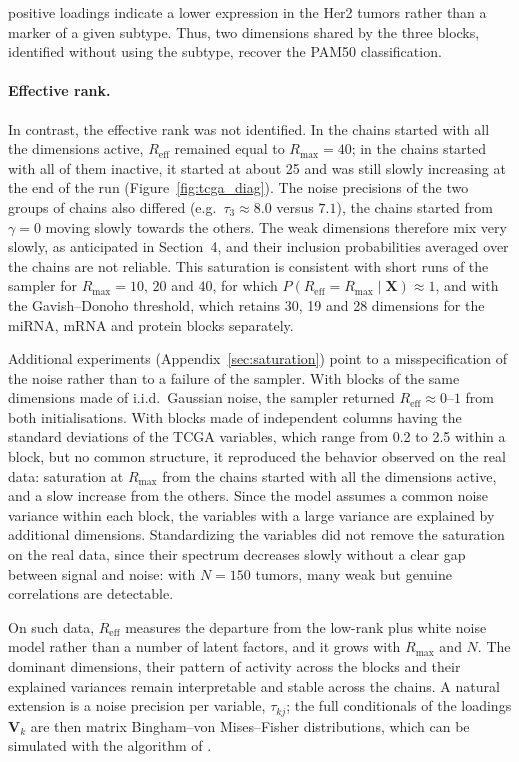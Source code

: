 \documentclass[11pt]{article}
\newcommand{\X}{\mathbf{X}}
\newcommand{\V}{\mathbf{V}}
\newcommand{\Reff}{R_{\mathrm{eff}}}
\begin{document}
positive loadings indicate a lower expression in the Her2 tumors rather than a marker of a given subtype. Thus, two dimensions shared by the three blocks, identified without using the subtype, recover the PAM50 classification.
 
\paragraph{Effective rank.} In contrast, the effective rank was not identified. In the chains started with all the dimensions active, $\Reff$ remained equal to $R_{\max}=40$; in the chains started with all of them inactive, it started at about 25 and was still slowly increasing at the end of the run (Figure~\ref{fig:tcga_diag}). The noise precisions of the two groups of chains also differed (e.g.\ $\tau_3\approx8.0$ versus $7.1$), the chains started from $\gamma=0$ moving slowly towards the others. The weak dimensions therefore mix very slowly, as anticipated in Section~4, and their inclusion probabilities averaged over the chains are not reliable. This saturation is consistent with short runs of the sampler for $R_{\max}=10$, $20$ and $40$, for which $P(\Reff=R_{\max}\mid\X)\approx1$, and with the Gavish--Donoho threshold, which retains 30, 19 and 28 dimensions for the miRNA, mRNA and protein blocks separately.
 
Additional experiments (Appendix~\ref{sec:saturation}) point to a misspecification of the noise rather than to a failure of the sampler. With blocks of the same dimensions made of i.i.d.\ Gaussian noise, the sampler returned $\Reff\approx0$--$1$ from both initialisations. With blocks made of independent columns having the standard deviations of the TCGA variables, which range from 0.2 to 2.5 within a block, but no common structure, it reproduced the behavior observed on the real data: saturation at $R_{\max}$ from the chains started with all the dimensions active, and a slow increase from the others. Since the model assumes a common noise variance within each block, the variables with a large variance are explained by additional dimensions. Standardizing the variables did not remove the saturation on the real data, since their spectrum decreases slowly without a clear gap between signal and noise: with $N=150$ tumors, many weak but genuine correlations are detectable.
 
On such data, $\Reff$ measures the departure from the low-rank plus white noise model rather than a number of latent factors, and it grows with $R_{\max}$ and $N$. The dominant dimensions, their pattern of activity across the blocks and their explained variances remain interpretable and stable across the chains. A natural extension is a noise precision per variable, $\tau_{kj}$; the full conditionals of the loadings $\V_k$ are then matrix Bingham--von Mises--Fisher distributions, which can be simulated with the algorithm of \citet{hoff2009}.
 
\end{document}

